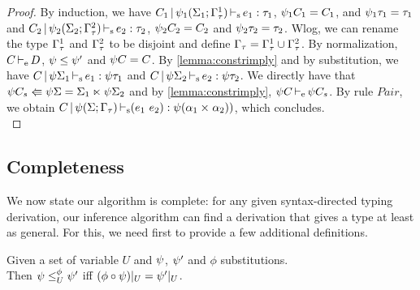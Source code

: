 \begin{theorem}
\begin{proof}
  By induction, we have
  $C_1 \operatorname{|} \mathrm{\psi}_1(\Sigma_1;\Gamma^1_\tau) \operatorname{\vdash_s} e_1 : \tau_1$, $\mathrm{\psi}_1 C_1 = C_1$,
  and $\mathrm{\psi}_1 \tau_1 = \tau_1$
  and
  $C_2 \operatorname{|} \mathrm{\psi}_2(\Sigma_2;\Gamma^2_\tau) \operatorname{\vdash_s} e_2 : \tau_2$, $\mathrm{\psi}_2 C_2 = C_2$
  and $\mathrm{\psi}_2 \tau_2 = \tau_2$.
  Wlog, we can rename the type $\Gamma^1_\tau$ and $\Gamma^2_\tau$ to be disjoint
  and define $\Gamma_\tau = \Gamma^1_\tau \cup \Gamma^2_\tau$.
  By normalization, $C \operatorname{\vdash_e} D$, $\mathrm{\psi} \leq \mathrm{\psi}'$ and $\mathrm{\psi} C = C$.
  By \cref{lemma:constrimply} and by substitution, we have
  $C \operatorname{|} \mathrm{\psi}\Sigma_1 \operatorname{\vdash_s} e_1 : \mathrm{\psi}\tau_1$ and
  $C \operatorname{|} \mathrm{\psi}\Sigma_2 \operatorname{\vdash_s} e_2 : \mathrm{\psi}\tau_2$.
  We directly have that
  $\mathrm{\psi} C_s \Lleftarrow \mathrm{\psi} \Sigma = \Sigma_1 \ltimes \mathrm{\psi}\Sigma_2$
  and by \cref{lemma:constrimply}, $\mathrm{\psi} C \operatorname{\vdash_e} \mathrm{\psi} C_s$.
  By rule $Pair$, we obtain
  $C \operatorname{|} \mathrm{\psi}(\Sigma;\Gamma_\tau) \operatorname{\vdash_s} (e_1\ e_2) : \mathrm{\psi}(\alpha_1 \times^{{}} \alpha_2))$,
  which concludes.
  \\





\end{proof}
\end{theorem}

\subsection{Completeness}

We now state our algorithm is complete: for any given
syntax-directed typing derivation, our inference algorithm can find
a derivation that gives a type at least as general.
For this, we need first to provide a few additional definitions.

\begin{definition}
  Given a set of variable $U$ and $\mathrm{\psi}$, $\mathrm{\psi}'$ and $\phi$
  substitutions. \\
  Then
  $\mathrm{\psi} \leq^{\phi}_{U} \mathrm{\psi}'$ iff $(\phi \circ \mathrm{\psi})|_{U} = \mathrm{\psi}'|_U$.
\end{definition}

